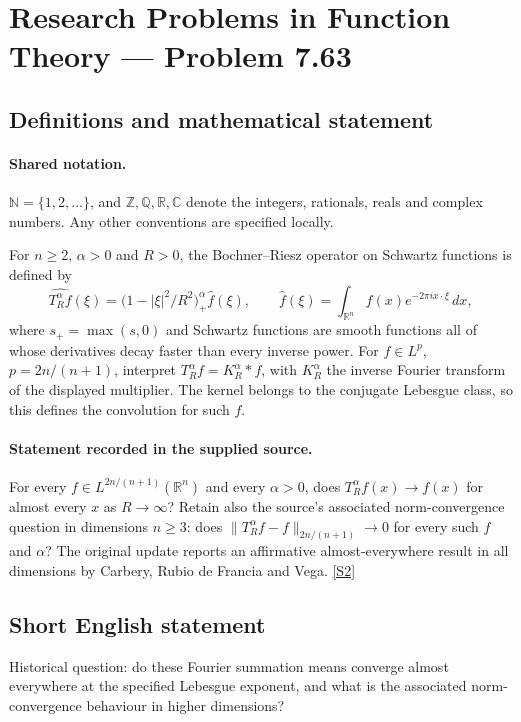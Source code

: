 \documentclass[11pt]{article}
\newcommand{\sref}[2]{\hyperlink{source:#1:#2}{[S#2]}}
\begin{document}
\section{Research Problems in Function Theory — Problem 7.63}\label{statement}

\subsection{Definitions and mathematical statement}

\paragraph{Shared notation.}$\mathbb N=\{1,2,\ldots\}$, and $\mathbb Z,\mathbb Q,\mathbb R,\mathbb C$ denote the integers, rationals, reals and complex numbers. Any other conventions are specified locally.


For $n\ge2$, $\alpha>0$ and $R>0$, the Bochner--Riesz operator on Schwartz functions is defined by
\[\widehat{T_R^\alpha f}(\xi)=\big(1-|\xi|^2/R^2\big)_+^\alpha\hat f(\xi),
\qquad\hat f(\xi)=\int_{\mathbb R^n}f(x)e^{-2\pi i x\cdot\xi}\,dx,
\]
where $s_+=\max(s,0)$ and Schwartz functions are smooth functions all of whose derivatives decay faster than every inverse power. For $f\in L^p$, $p=2n/(n+1)$, interpret $T_R^\alpha f=K_R^\alpha*f$, with $K_R^\alpha$ the inverse Fourier transform of the displayed multiplier. The kernel belongs to the conjugate Lebesgue class, so this defines the convolution for such $f$.
\paragraph{Statement recorded in the supplied source.}
For every $f\in L^{2n/(n+1)}(\mathbb R^n)$ and every $\alpha>0$, does $T_R^\alpha f(x)\to f(x)$ for almost every $x$ as $R\to\infty$? Retain also the source's associated norm-convergence question in dimensions $n\ge3$: does $\|T_R^\alpha f-f\|_{2n/(n+1)}\to0$ for every such $f$ and $\alpha$? The original update reports an affirmative almost-everywhere result in all dimensions by Carbery, Rubio de Francia and Vega. \sref{statement}{2}
\subsection{Short English statement}
Historical question: do these Fourier summation means converge almost everywhere at the specified Lebesgue exponent, and what is the associated norm-convergence behaviour in higher dimensions?
\end{document}

